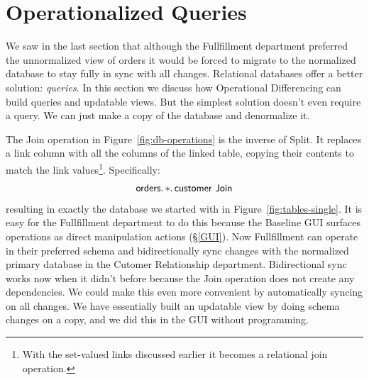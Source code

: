 \documentclass[english,submission]{programming}
\theoremstyle{definition}
\begin{document}
\section{Operationalized Queries}

We saw in the last section that although the Fullfillment department preferred the unnormalized view of orders it would be forced to migrate to the normalized database to stay fully in sync with all changes. Relational databases offer a better solution: \textit{queries}. In this section we discuss how Operational Differencing can build queries and updatable views. But the simplest solution doesn't even require a query. We can just make a copy of the database and denormalize it.

The \textsf{Join} operation in Figure~\ref{fig:db-operations} is the inverse of \textsf{Split}. It replaces a link column with all the columns of the linked table, copying their contents to match the link values\footnote{With the set-valued links discussed earlier it becomes a relational join operation.}. Specifically:
\[
\textsf{orders}\ldotp * \ldotp \textsf{customer Join} \\
\]
resulting in exactly the database we started with in Figure~\ref{fig:tables-single}. It is easy for the Fullfillment department to do this because the Baseline GUI surfaces operations as direct manipulation actions (\S\ref{GUI}). Now Fullfillment can operate in their preferred schema and bidirectionally sync changes with the normalized primary database in the Cutomer Relationship department. Bidirectional sync works now when it didn't before because the \textsf{Join} operation does not create any dependencies. We could make this even more convenient by automatically syncing on all changes. We have essentially built an updatable view by doing schema changes on a copy, and we did this in the GUI without programming.
\end{document}
